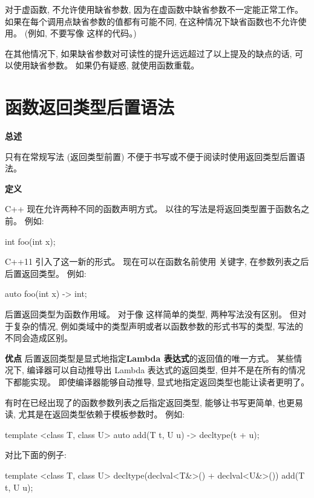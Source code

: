 对于虚函数, 不允许使用缺省参数, 因为在虚函数中缺省参数不一定能正常工作。 如果在每个调用点缺省参数的值都有可能不同, 在这种情况下缺省函数也不允许使用。 (例如, 不要写像  这样的代码。)

在其他情况下, 如果缺省参数对可读性的提升远远超过了以上提及的缺点的话, 可以使用缺省参数。 如果仍有疑惑, 就使用函数重载。

\section{函数返回类型后置语法}

\textbf{总述}

只有在常规写法 (返回类型前置) 不便于书写或不便于阅读时使用返回类型后置语法。

\textbf{定义}

C++ 现在允许两种不同的函数声明方式。 以往的写法是将返回类型置于函数名之前。 例如:

\begin{cppcode}
int foo(int x);
\end{cppcode}

C++11 引入了这一新的形式。 现在可以在函数名前使用  关键字, 在参数列表之后后置返回类型。 例如:

\begin{cppcode}
auto foo(int x) -> int;
\end{cppcode}

后置返回类型为函数作用域。 对于像  这样简单的类型, 两种写法没有区别。 但对于复杂的情况, 例如类域中的类型声明或者以函数参数的形式书写的类型, 写法的不同会造成区别。

\textbf{优点}
后置返回类型是显式地指定\textbf{Lambda 表达式}的返回值的唯一方式。 某些情况下, 编译器可以自动推导出 Lambda 表达式的返回类型, 但并不是在所有的情况下都能实现。 即使编译器能够自动推导, 显式地指定返回类型也能让读者更明了。

有时在已经出现了的函数参数列表之后指定返回类型, 能够让书写更简单, 也更易读, 尤其是在返回类型依赖于模板参数时。 例如:

\begin{cppcode}
  template <class T, class U> auto add(T t, U u) -> decltype(t + u);
\end{cppcode}

对比下面的例子:

\begin{cppcode}
  template <class T, class U> decltype(declval<T&>() + declval<U&>()) add(T t, U u);
\end{cppcode}

